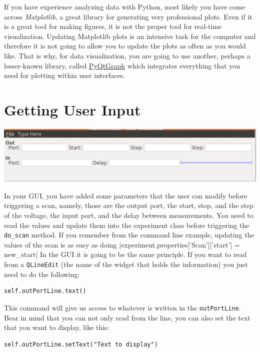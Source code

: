 If you have experience analyzing data with Python, most likely you have
come across \emph{Matplotlib}, a great library for generating very
professional plots. Even if it is a great tool for making
figures, it is not the proper tool for real-time visualization. Updating
Matplotlib plots is an intensive task for the computer and therefore it
is not going to allow you to update the plots as often as you would
like. That is why, for data visualization, you are going to use another,
perhaps a lesser-known library, called
\href{http://www.pyqtgraph.org/}{PyQtGraph} which integrates everything
that you need for plotting within user interfaces.

\section{Getting User Input}\label{getting-userinput}

\begin{center}
\includegraphics[width=.6\textwidth]{images/scan_window.png}
\end{center}

In your {GUI}, you have added some parameters that the user can modify
before triggering a scan, namely, those are the output port, the start,
stop, and the step of the voltage, the input port, and the delay between
measurements. You need to read the values and update them into the
experiment class before triggering the \texttt{do_scan} method. If you
remember from the command line example, updating the values of the scan
is as easy as doing
|experiment.properties['Scan']['start'] = new_start|
In the {GUI} it is going to be the same principle. If you want to read
from a \texttt{QLineEdit} (the name of the widget that holds the
information) you just need to do the following:

\begin{verbatim}
self.outPortLine.text()
\end{verbatim}

This command will give us access to whatever is written in the
\texttt{outPortLine}. Bear in mind that you can not only read from the
line, you can also set the text that you want to display, like this:

\begin{verbatim}
self.outPortLine.setText("Text to display")
\end{verbatim}

